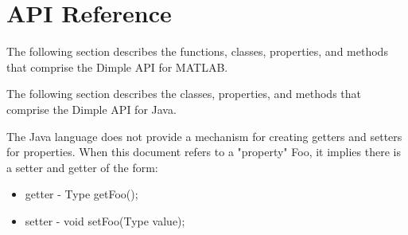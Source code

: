\section{API Reference}

\ifmatlab
The following section describes the functions, classes, properties, and methods that comprise the Dimple API for MATLAB. 
\fi


\ifjava
The following section describes the classes, properties, and methods that comprise the Dimple API for Java. 

The Java language does not provide a mechanism for creating getters and setters for properties.  When this document refers to a "property" Foo, it implies there is a setter and getter of the form:

\begin{itemize}
\item getter - Type getFoo();
\item setter - void setFoo(Type value);
\end{itemize}
\fi










\ifmatlab

\fi


